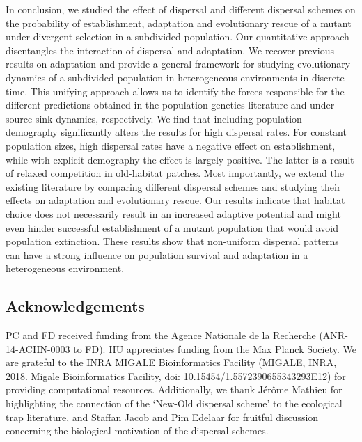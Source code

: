\documentclass[11pt]{article}
\newcommand{\chg}[1]{\textcolor{change}{#1}}
\begin{document}
In conclusion, we studied the effect of dispersal and different dispersal schemes on the probability of establishment, adaptation and evolutionary rescue of a mutant under divergent selection in a subdivided population. Our quantitative approach disentangles the interaction of dispersal and adaptation. We recover previous results on adaptation and provide a general framework for studying evolutionary dynamics of a subdivided population in heterogeneous environments \chg{in discrete time}. This unifying approach allows us to identify the forces responsible for the different predictions obtained in the population genetics literature and under source-sink dynamics, respectively. We find that including population demography significantly alters the results for high dispersal rates. For constant population sizes, high dispersal rates have a negative effect on establishment, while with explicit demography the effect is largely positive. The latter is a result of relaxed competition in old-habitat patches. Most importantly, we extend the existing literature by comparing different dispersal schemes and studying their effects on adaptation and evolutionary rescue. Our results indicate that habitat choice does not necessarily result in an increased adaptive potential and might even hinder successful establishment of a mutant population that would avoid population extinction.  %
These results show that non-\chg{uniform} dispersal patterns can have a strong influence on population survival and adaptation in a heterogeneous environment. 

\subsection*{Acknowledgements}
PC and FD received funding from the Agence Nationale de la Recherche (ANR-14-ACHN-0003 to FD). HU appreciates funding from the Max Planck Society. We are grateful to the INRA MIGALE Bioinformatics Facility (MIGALE, INRA, 2018. Migale Bioinformatics Facility, doi: 10.15454/1.5572390655343293E12) for providing computational resources. Additionally, we thank J\'{e}r\^{o}me Mathieu for highlighting the connection of the `New-Old dispersal scheme' to the ecological trap literature, and Staffan Jacob and Pim Edelaar for fruitful discussion concerning the biological motivation of the dispersal schemes. 



\end{document}
